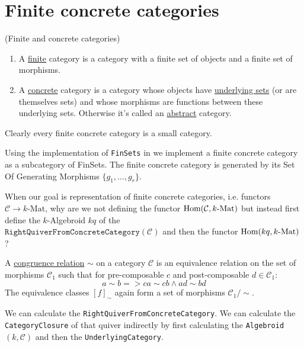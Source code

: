 
\section{Finite concrete categories}

\begin{definition}{(Finite and concrete categories)}
\renewcommand{\labelenumi}{(\theenumi)}
\begin{enumerate}
\item A \ul{finite} category is a category with a finite set of objects and a finite set of morphisms.
\item A \ul{concrete} category is a category whose objects have \ul{underlying sets} (or are themselves sets) and whose morphisms are
functions between these underlying sets. Otherwise it's called an \ul{abstract} category.
\end{enumerate}
\end{definition}

\noindent Clearly every finite concrete category is a small category.

\begin{remark}[Implementation]
Using the implementation of \texttt{FinSets} in %
we implement a finite concrete category as a subcategory of FinSets.
The finite concrete category is generated by its Set Of Generating Morphisms $\{g_{1},\dots,g_{r}\}$.
\end{remark}

When our goal is representation of finite concrete categories, i.e. functors $\mathcal{C} \rightarrow k\text{-Mat}$, why are we not
defining the functor $\textup{Hom}(\mathcal{C},k\text{-Mat})$ but instead first define the $k$-Algebroid $kq$ of the\\
$\texttt{RightQuiverFromConcreteCategory}(\mathcal{C})$ and then the functor $\textup{Hom}(kq,k\textup{-Mat})$?

\begin{definition}
A \ul{congruence relation} $\sim$ on a category $\mathcal{C}$ is an equivalence relation on the set of morphisms $\mathcal{C}_{1}$ such that
for pre-composable $c$ and post-composable $d \in \mathcal{C}_{1}$:
\[ a \sim b => ca \sim cb \land ad \sim bd \]
The equivalence classes $[f]_{\sim}$ again form a set of morphisms $\mathcal{C}_{1}/\sim$.
\end{definition}

We can calculate the \texttt{RightQuiverFromConcreteCategory}. We can calculate the \texttt{CategoryClosure} of that quiver indirectly by first
calculating the \texttt{Algebroid}$( k, \mathcal{C} )$ and then the \texttt{UnderlyingCategory}.


